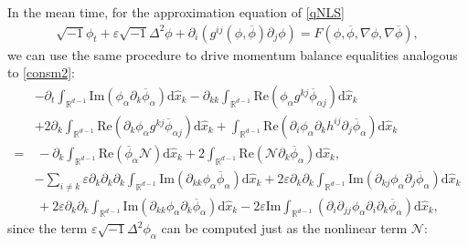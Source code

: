 \documentclass[10pt,twoside,a4paper]{article}
\numberwithin{equation}{section}\allowdisplaybreaks
\begin{document}
	
	
	In the mean time, for the   approximation equation of \eqref{qNLS}
	\begin{align*}
		\sqrt{-1}\phi_t+	\varepsilon\sqrt{-1}\Delta^2 \phi+\partial_i\left( g^{ij}\left(\phi,\overline{\phi}\right) \partial_j \phi\right)=F\left(\phi,\overline{\phi},\nabla\phi, \nabla \overline{\phi}\right),
	\end{align*}
we can use the same procedure to drive momentum balance equalities analogous to \eqref{consm2}:
\begin{align} \label{aconsm}
	&	-\partial_t \int_{\mathbb{R}^{d-1}}  \mathrm{Im}\left( \phi_{\alpha } \partial_k \overline{\phi}_\alpha \right) \mathrm{d} \hat{x}_k-\partial_{kk} \int_{\mathbb{R}^{d-1}} \mathrm{Re}\left( \phi_{\alpha }   g^{kj} \overline{\phi}_{\alpha j}\right) \mathrm{d} \hat{x}_k\nonumber\\
	&+2 \partial_k \int_{\mathbb{R}^{d-1}} \mathrm{Re}\left(\partial_k \phi_{\alpha }  g^{kj} \overline{\phi}_{\alpha j}\right) \mathrm{d} \hat{x}_k + \int_{\mathbb{R}^{d-1}}  \mathrm{Re}\left(\partial_{i} \phi_{\alpha }  \partial_k h^{ij} \partial_j \overline{\phi}_{\alpha }\right)  \mathrm{d} \hat{x}_k \\
	=&\,- \partial_k\int_{\mathbb{R}^{d-1}}   \mathrm{Re}\left( \overline{\phi }_{\alpha } \mathcal{N}\right)\mathrm{d} \hat{x}_k+2\int_{\mathbb{R}^{d-1}} \mathrm{Re} \left(\mathcal{N} \partial_k \overline{\phi}_\alpha\right)   \mathrm{d} \hat{x}_k,\nonumber\\
		&-\sum_{i \neq k} \varepsilon \partial_k \partial_k\partial_k  \int_{\mathbb{R}^{d-1}} \mathrm{Im}\left(\partial_{kk} \phi_{\alpha }  \overline{\phi}_\alpha\right)  \mathrm{d} \hat{x}_k+2 \varepsilon \partial_{k}\partial_{k}\int_{\mathbb{R}^{d-1}} \mathrm{Im}\left(\partial_{kj} \phi_{\alpha } \partial_j \overline{\phi}_\alpha\right) \mathrm{d} \hat{x}_k \nonumber\\
	&\,	+2 \varepsilon \partial_{k}\partial_{k}\int_{\mathbb{R}^{d-1}} \mathrm{Im}\left(\partial_{kk} \phi_{\alpha } \partial_k \overline{\phi}_\alpha\right) \mathrm{d} \hat{x}_k-2\varepsilon\mathrm{Im}\int_{\mathbb{R}^{d-1}} \left(\partial_{i}\partial_{jj} \phi_\alpha\partial_i\partial_k \overline{\phi}_\alpha\right)  \mathrm{d} \hat{x}_k,\nonumber
\end{align} 
since  the term $ 	\varepsilon\sqrt{-1}\Delta^2 \phi_\alpha $ can be computed just as the nonlinear term $ \mathcal{N} $:
\end{document}
